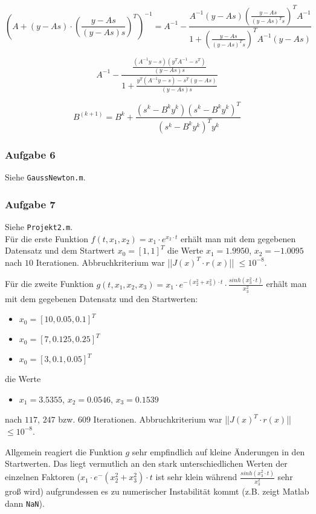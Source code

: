 \documentclass[a4paper, 12pt]{report}
\begin{document}
$$\left(A + \left(y - As\right)\cdot\left( \frac{ y-As }{ (y-As)s } \right)^T\right)^{-1} = A^{-1} - \frac{ A^{-1}(y-As)\left(\frac{ y-As }{ (y-As)^Ts } \right)^TA^{-1} }{1 + \left(\frac{ y-As }{ (y-As)^Ts }\right)^TA^{-1}(y-As)}$$

$$A^{-1} - \frac{ \frac{(A^{-1}y-s)(y^TA^{-1}-s^T)}{(y-As)s} }{ 1 + \frac{y^T(A^{-1}y-s) - s^T(y - As)}{(y-As)s} }$$

$$B^{(k+1)} = B^{k} + \frac{(s^k - B^ky^k)(s^k - B^ky^k)^T}{(s^k-B^ky^k)^Ty^k}$$

\subsubsection{Aufgabe 6}

Siehe \lstinline[basicstyle=\ttfamily\color{black}]|GaussNewton.m|.

\subsubsection{Aufgabe 7}

Siehe \lstinline[basicstyle=\ttfamily\color{black}]|Projekt2.m|.\\
Für die erste Funktion $f(t, x_1, x_2) = x_1\cdot e^{x_2\cdot t}$ erhält man mit dem gegebenen Datensatz und dem
Startwert $x_0 = [1, 1]^T$ die Werte $x_1 = 1.9950$, $x_2 = -1.0095$ nach $10$ Iterationen. Abbruchkriterium war
||$J(x)^T\cdot r(x)$|| $ \leq 10^{-8}$.\par
Für die zweite Funktion $g(t, x_1, x_2, x_3) = x_1 \cdot e^{ -(x_2^2 + x_3^2)\cdot t }\cdot \frac{sinh(x_3^2\cdot t)}{x_3^2}$
erhält man mit dem gegebenen Datensatz und den Startwerten:
\begin{itemize}
  \item $x_0 = [10, 0.05, 0.1]^T$
  \item $x_0 = [7, 0.125, 0.25]^T$
  \item $x_0 = [3, 0.1, 0.05]^T$
\end{itemize}
die Werte
\begin{itemize}
  \item $x_1 = 3.5355$, $x_2 = 0.0546$, $x_3 = 0.1539$
\end{itemize}
nach $117$, $247$ bzw. $609$ Iterationen. Abbruchkriterium war ||$J(x)^T\cdot r(x)$|| $ \leq 10^{-8}$.\par
Allgemein reagiert die Funktion $g$ sehr empfindlich auf kleine Änderungen in den Startwerten. Das liegt vermutlich an den
stark unterschiedlichen Werten der einzelnen Faktoren ($x_1\cdot e^-{ (x_2^2 + x_3^2)\cdot t}$ ist sehr klein während
$\frac{sinh(x_3^2\cdot t)}{x_3^2}$ sehr groß wird) aufgrundessen es zu numerischer Instabilität kommt (z.B. zeigt Matlab
dann \lstinline[basicstyle=\ttfamily\color{black}]|NaN|).
\end{document}
